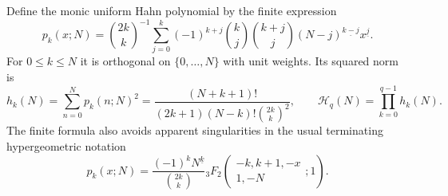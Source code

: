 \documentclass[11pt,a4paper]{article}
\theoremstyle{definition}
\theoremstyle{remark}
\numberwithin{equation}{section}
\begin{document}
Define the monic uniform Hahn polynomial by the finite expression
\begin{equation}\label{hp:hahn}
 p_k(x;N)=\binom{2k}{k}^{-1}
 \sum_{j=0}^k(-1)^{k+j}\binom kj\binom{k+j}{j}
                  (N-j)^{\underline{k-j}}x^{\underline j}.
\end{equation}
For $0\le k\le N$ it is orthogonal on $\{0,\ldots,N\}$ with
unit weights. Its squared norm is
\begin{equation}\label{hp:norm}
 h_k(N)=\sum_{n=0}^Np_k(n;N)^2
   =\frac{(N+k+1)!}{(2k+1)(N-k)!\binom{2k}{k}^2},
 \qquad \mathcal H_q(N)=\prod_{k=0}^{q-1}h_k(N).
\end{equation}
The finite formula also avoids apparent singularities in the
usual terminating hypergeometric notation
\[
 p_k(x;N)=
 \frac{(-1)^kN^{\underline k}}{\binom{2k}{k}}
 {}_3F_2\!\left(\begin{matrix}-k,k+1,-x\\1,-N\end{matrix};1\right).
\]
\end{document}
